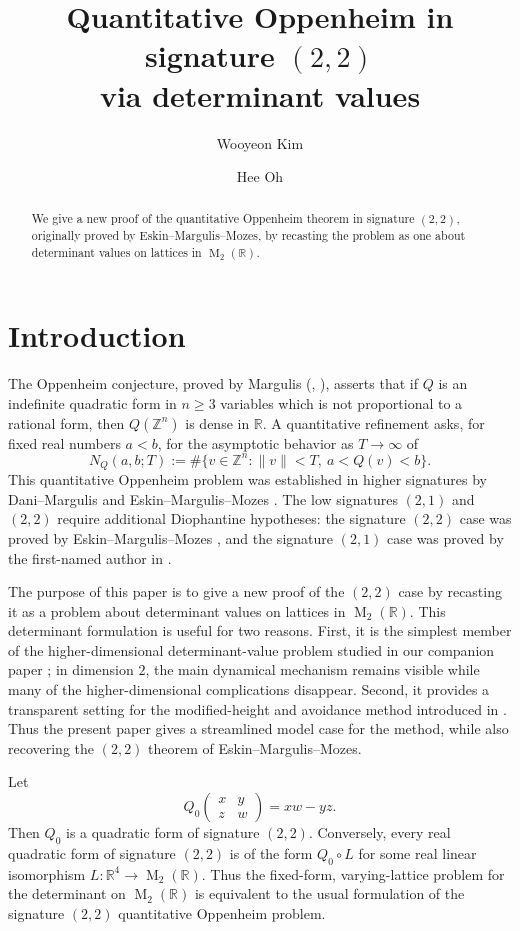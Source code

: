 \documentclass[reqno,11pt]{amsart}
\title[Quantitative Oppenheim in signature $(2,2)$]{Quantitative Oppenheim in signature $(2,2)$ \\ via determinant values}
\author{Wooyeon Kim}
\author{Hee Oh}
\theoremstyle{definition}
\theoremstyle{remark}
\numberwithin{equation}{section}
\newcommand{\M}{\operatorname{M}}
\begin{document}
\begin{abstract}
We give a new proof of the quantitative Oppenheim theorem in signature
$(2,2)$, originally proved by Eskin--Margulis--Mozes, by recasting the
problem as one about determinant values on lattices in $\M_2(\mathbb R)$.
\end{abstract}

\maketitle
\section{Introduction}
The Oppenheim conjecture, proved by Margulis
(\cite{Margulis:1987}, \cite{Margulis:1989}), asserts that if $Q$ is an indefinite
quadratic form in $n\ge3$ variables which is not proportional to a rational
form, then $Q(\mathbb Z^n)$ is dense in $\mathbb R$. A quantitative
refinement asks, for fixed real numbers $a<b$, for the asymptotic behavior
as $T\to\infty$ of
$$
N_Q(a,b;T)
:=
\#\{v\in\mathbb Z^n:\|v\|<T,\ a<Q(v)<b\}.
$$
This quantitative Oppenheim problem was established in higher signatures by
Dani--Margulis \cite{dani-margulis:1993} and
Eskin--Margulis--Mozes \cite{eskin-margulis-mozes:1998}. The low signatures
$(2,1)$ and $(2,2)$ require additional Diophantine hypotheses: the
signature $(2,2)$ case was proved by Eskin--Margulis--Mozes
\cite{eskin-margulis-mozes:2005}, and the signature $(2,1)$ case was
proved by the first-named author in \cite{Kim}.

The purpose of this paper is to give a new proof of the $(2,2)$ case by
recasting it as a problem about determinant values on lattices in
$\M_2(\mathbb R)$. This determinant formulation is useful for two reasons.
First, it is the simplest member of the higher-dimensional determinant-value
problem studied in our companion paper \cite{KimOh_det}; in dimension $2$, the
main dynamical mechanism remains visible while many of the higher-dimensional
complications disappear. Second, it provides a transparent setting for the
modified-height and avoidance method introduced in \cite{Kim}. Thus the
present paper gives a streamlined model case for the method, while also
recovering the $(2,2)$ theorem of Eskin--Margulis--Mozes.

Let
$$
Q_0\begin{pmatrix}x&y\\ z&w\end{pmatrix}
=xw-yz.
$$
Then $Q_0$ is a quadratic form of signature $(2,2)$. Conversely, every
real quadratic form of signature $(2,2)$ is of the form
$Q_0\circ L$ for some real linear isomorphism
$L:\mathbb R^4\to\M_2(\mathbb R)$. Thus the fixed-form, varying-lattice
problem for the determinant on $\M_2(\mathbb R)$ is equivalent to the
usual formulation of the signature $(2,2)$ quantitative Oppenheim problem.
\end{document}
